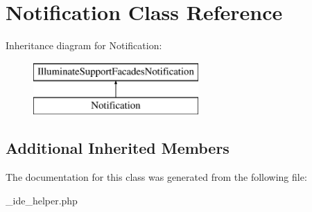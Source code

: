 \hypertarget{class_notification}{}\section{Notification Class Reference}
\label{class_notification}
Inheritance diagram for Notification\+:\begin{figure}[H]
\begin{center}
\leavevmode
\includegraphics[height=2.000000cm]{class_notification}
\end{center}
\end{figure}
\subsection*{Additional Inherited Members}


The documentation for this class was generated from the following file\+:\begin{DoxyCompactItemize}
\item 
\+\_\+ide\+\_\+helper.\+php\end{DoxyCompactItemize}

